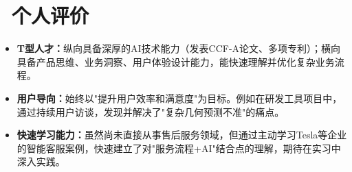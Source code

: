 \documentclass[11pt]{article}
\begin{document}
\section{\makebox[\widthof{\faUser}][c]{\color{CVBlue}\faUser}\ 个人评价}

\begin{itemize}
    \item \textbf{T型人才：}纵向具备深厚的AI技术能力（发表CCF-A论文、多项专利）；横向具备产品思维、业务洞察、用户体验设计能力，能快速理解并优化复杂业务流程。
    \item \textbf{用户导向：}始终以"提升用户效率和满意度"为目标。例如在研发工具项目中，通过持续用户访谈，发现并解决了"复杂几何预测不准"的痛点。
    \item \textbf{快速学习能力：}虽然尚未直接从事售后服务领域，但通过主动学习Tesla等企业的智能客服案例，快速建立了对"服务流程+AI"结合点的理解，期待在实习中深入实践。
\end{itemize}
\end{document}
